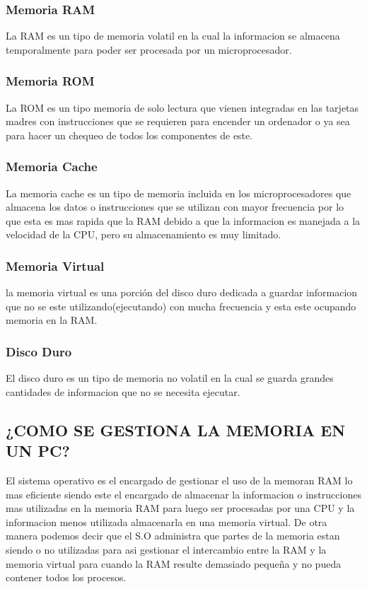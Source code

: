 \documentclass{article}
\begin{document}
\subsubsection{Memoria RAM}
{\raggedleft
La RAM es un tipo de memoria volatil en la cual la informacion se almacena temporalmente para poder ser procesada por un microprocesador.
}
\subsubsection{Memoria ROM}
{\raggedleft
La ROM es un tipo memoria de solo lectura que vienen integradas en las tarjetas madres con instrucciones que se requieren para encender un ordenador o ya sea para hacer un chequeo de todos los componentes de este.\cite{tutorialspoint}
}
\subsubsection{Memoria Cache}
{\raggedleft
La memoria cache es un tipo de memoria incluida en los microprocesadores que almacena los datos o instrucciones que se utilizan con mayor frecuencia por lo que esta es mas rapida que la RAM debido a que la informacion es manejada a la velocidad de la CPU, pero su almacenamiento es muy limitado.\cite{tutorialspoint}
}
\subsubsection{Memoria Virtual}
{\raggedleft
la memoria virtual es una porción del disco duro dedicada a guardar informacion que no se este utilizando(ejecutando) con mucha frecuencia y esta este ocupando memoria en la RAM.\cite{tallermemoria}
}
\subsubsection{Disco Duro}
{\raggedleft
El disco duro es un tipo de memoria no volatil en la cual se guarda grandes cantidades de informacion que no se necesita ejecutar.
}

\subsection{¿COMO SE GESTIONA LA MEMORIA EN UN PC?}
{\raggedleft
El sistema operativo es el encargado de gestionar el uso de la memoran RAM lo mas eficiente siendo este el encargado de almacenar la informacion o instrucciones mas utilizadas en la memoria RAM para luego ser procesadas por una CPU y la informacion menos utilizada almacenarla en una memoria virtual.
De otra manera podemos decir que el S.O administra que partes de la memoria estan siendo o no utilizadas para asi gestionar el intercambio entre la RAM y la memoria virtual para cuando la RAM resulte demasiado pequeña y no pueda contener todos los procesos.\cite{gestionmemoria}
}
\end{document}

